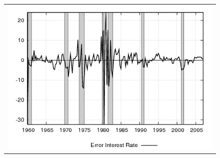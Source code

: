 \documentclass[12pt]{article}
\begin{document}
\begin{figure}[ht]
\begin{center}
\begin{tabular}{c}
\includegraphics[scale=0.5]{results_cg_wlsinit/fedfunds_err.png} 
\end{tabular}
\end{center}
\end{figure}
\end{document}

